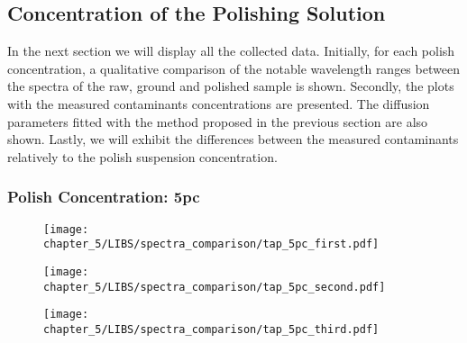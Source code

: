 \subsection{Concentration of the Polishing Solution}
\label{subsec:conc_results}
In the next section we will display all the collected data. Initially, for each polish concentration, a qualitative comparison of the notable wavelength ranges between the spectra of the raw, ground and polished sample is shown. Secondly, the plots with the measured contaminants concentrations are presented. The diffusion parameters fitted with the method proposed in the previous section are also shown. Lastly, we will exhibit the differences between the measured contaminants relatively to the polish suspension concentration.
\\
\subsubsection{Polish Concentration: 5pc}
\label{subsubsec:5pc}
\vspace*{-25pt}
\begin{figure}[H]
    \centering
    \texttt{[image: chapter\_5/LIBS/spectra\_comparison/tap\_5pc\_first.pdf]} 
 \end{figure}

\vspace*{-68pt}
\begin{figure}[H]
    \centering
    \texttt{[image: chapter\_5/LIBS/spectra\_comparison/tap\_5pc\_second.pdf]} 
 \end{figure}

\vspace*{-68pt}
\begin{figure}[H]
    \centering
    \texttt{[image: chapter\_5/LIBS/spectra\_comparison/tap\_5pc\_third.pdf]} 
 \end{figure}

